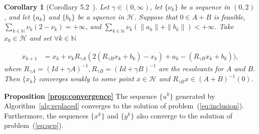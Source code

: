\documentclass[10pt]{article} %
\newtheorem{corollary}[thm]{Corollary}
\begin{document}
\begin{corollary}[Corollary 5.2~\citet{combettes2004solving}]
Let $\gamma\in (0, \infty)$, let $\{\nu_k\}$ be a sequence in $(0,2)$, and let $\{a_k\}$ and $\{b_k\}$ be a squence in $\mathcal{H}$.
Suppose that $0\in A + B$ is feasible, $\sum_{k\in\mathbb{N}}\nu_k(2-\nu_k) = +\infty$, and $\sum_{k\in\mathbb{N}} \nu_k\left(\|a_k\|+\|b_k\|\right)<+\infty$.
Take $x_0\in \mathcal{H}$ and set $\forall k\in \mathbb{N}$

\label{cor:5-2}
\begin{equation*}
\begin{aligned}
x_{k+1} &= x_k + \nu_k R_{\gamma A}\left(2\left(R_{\gamma B} x_k + b_k\right) - x_k \right) + a_k - \left(R_{\gamma B} x_k + b_k\right)),
\end{aligned}
\end{equation*}
\label{eq:cor5-2}
where $R_{\gamma A} = \left(Id + \gamma A\right)^{-1}, R_{\gamma B} = \left(Id + \gamma B\right)^{-1}$ are the resolvants for $A$ and $B$.
Then $\{x_k\}$ converges weakly to some point $x\in \mathcal{H}$ and $R_{\gamma B} x \in \left(A+B\right)^{-1}(0)$.
\end{corollary}

\textbf{Proposition \ref{prop:convergence}}
The sequence $\{u^k\}$ generated by Algorithm~\ref{alg:replaced} converges to the solution of problem~(\ref{eq:inclusion}). 
Furthermore, the sequences $\{x^k\}$ and $\{y^k\}$ also converge to the solution of problem~(\ref{eq:qcp}). 
\end{document}
